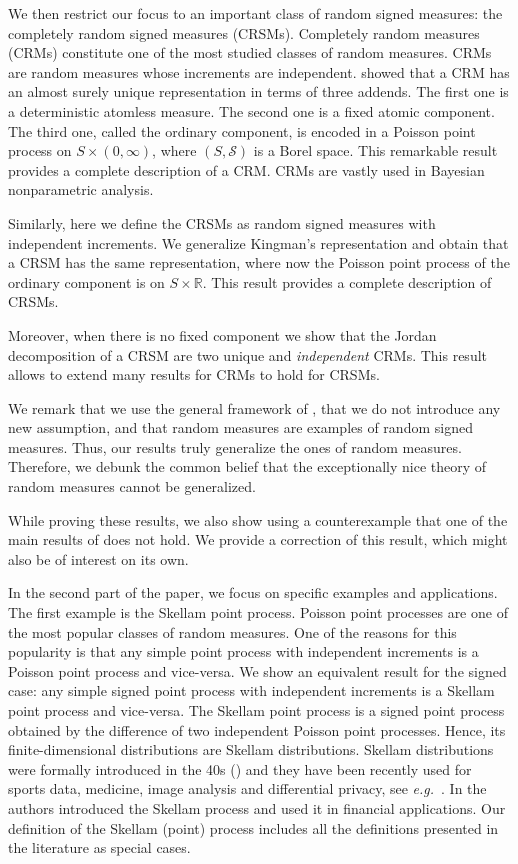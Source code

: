 \documentclass{article}
\theoremstyle{plain}
\theoremstyle{remark}
\begin{document}
We then restrict our focus to an important class of random signed measures: the completely random signed measures (CRSMs). Completely random measures (CRMs) constitute one of the most studied classes of random measures. CRMs are random measures whose increments are independent. \citet{Kingman} showed that a CRM has an almost surely unique representation in terms of three addends. The first one is a deterministic atomless measure. The second one is a fixed atomic component. The third one, called the ordinary component, is encoded in a Poisson point process on $S\times(0,\infty)$, where $(S,\mathcal{S})$ is a Borel space. This remarkable result provides a complete description of a CRM. CRMs are vastly used in Bayesian nonparametric analysis.

Similarly, here we define the CRSMs as random signed measures with independent increments. We generalize Kingman's representation and obtain that a CRSM has the same representation, where now the Poisson point process of the ordinary component is on $S\times\mathbb{R}$. This result provides a complete description of CRSMs.

Moreover, when there is no fixed component we show that the Jordan decomposition of a CRSM are two unique and \textit{independent} CRMs. This result allows to extend many results for CRMs to hold for CRSMs.


We remark that we use the general framework of \citet{Kallenberg2}, that we do not introduce any new assumption, and that random measures are examples of random signed measures. Thus, our results truly generalize the ones of random measures. Therefore, we debunk the common belief that the exceptionally nice theory of random measures cannot be generalized.

While proving these results, we also show using a counterexample that one of the main results of \citet{Daley} does not hold. We provide a correction of this result, which might also be of interest on its own.

In the second part of the paper, we focus on specific examples and applications. The first example is the Skellam point process. Poisson point processes are one of the most popular classes of random measures. One of the reasons for this popularity is that any simple point process with independent increments is a Poisson point process and vice-versa. We show an equivalent result for the signed case: any simple signed point process with independent increments is a Skellam point process and vice-versa. The Skellam point process is a signed point process obtained by the difference of two independent Poisson point processes. Hence, its finite-dimensional distributions are Skellam distributions. Skellam distributions were formally introduced in the 40s (\citet{Irwin,Skellam}) and they have been recently used for sports data, medicine, image analysis and differential privacy, see \textit{e.g.}~\citet{Aga,Karl3,Tomy}. In \citet{Bar} the authors introduced the Skellam process and used it in financial applications. Our definition of the Skellam (point) process includes all the definitions presented in the literature as special cases. 
\end{document}
